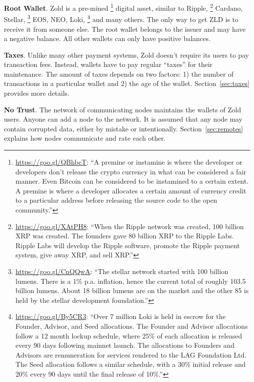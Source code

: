 \documentclass{main}
\begin{document}
\textbf{Root Wallet}.
Zold is a pre-mined%
\footnote{%
  \url{https://goo.gl/QBhbcT}:
  ``A premine or instamine is where the developer or developers don't release
  the crypto currency in what can be considered a fair manner.
  Even Bitcoin can be considered to be instamined to a certain extent.
  A premine is where a developer allocates a certain amount of currency
  credit to a particular address before releasing the source
  code to the open community.''
}
digital asset, similar to Ripple,%
\footnote{%
  \url{https://goo.gl/XAtPH8}:
  ``When the Ripple network was created, 100 billion XRP was created.
  The founders gave 80 billion XRP to the Ripple Labs. Ripple Labs
  will develop the Ripple software, promote the Ripple payment system,
  give away XRP, and sell XRP.''
}
Cardano,
Stellar,%
\footnote{%
  \url{https://goo.gl/CnQQwA}:
  ``The stellar network started with 100 billion lumens.
  There is a 1\% p.a. inflation, hence the current total of roughly 103.5 billion lumens.
  About 18 billion lumens are on the market and the other
  85 is held by the stellar development foundation.''
}
EOS, NEO, Loki,%
\footnote{%
  \url{https://goo.gl/By5CR3}:
  ``Over 7 million Loki is held in escrow for the Founder,
  Advisor, and Seed allocations. The Founder and Advisor allocations
  follow a 12 month lockup schedule, where 25\% of each allocation is
  released every 90 days following mainnet launch. The allocations
  to Founders and Advisors are remuneration for services rendered to the
  LAG Foundation Ltd. The Seed allocation follows a similar schedule, with a
  30\% initial release and 20\% every 90 days until the final release of 10\%.''
}
and many others.
The only way to get ZLD is to receive it from someone else.
The root wallet belongs to the issuer and may have a negative balance.
All other wallets can only have positive balances.

\textbf{Taxes}.
Unlike many other payment systems, Zold doesn't require its users
to pay transaction fees. Instead, wallets have to pay regular ``taxes'' for their maintenance.
The amount of taxes depends on two factors: 1) the number
of transactions in a particular wallet and 2) the age of the wallet.
Section~\ref{sec:taxes} provides more details.

\textbf{No Trust}.
The network of communicating nodes maintains the wallets of Zold users.
Anyone can add a node to the network.
It is assumed that any node may contain corrupted data, either by mistake or intentionally.
Section~\ref{sec:remotes} explains how nodes communicate and rate each other.
\end{document}
